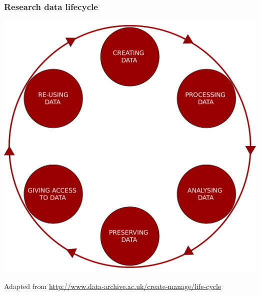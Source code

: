 \documentclass{beamer}
\begin{document}
\begin{frame}
  \frametitle{Research data lifecycle}
  
  \begin{center}
  \includegraphics[height=0.7\paperheight]{graphics/research-data-lifecycle.pdf}
  \end{center}
  
  \begin{center}
     \tiny Adapted from \url{http://www.data-archive.ac.uk/create-manage/life-cycle}
  \end{center}
\end{frame}
\end{document}
